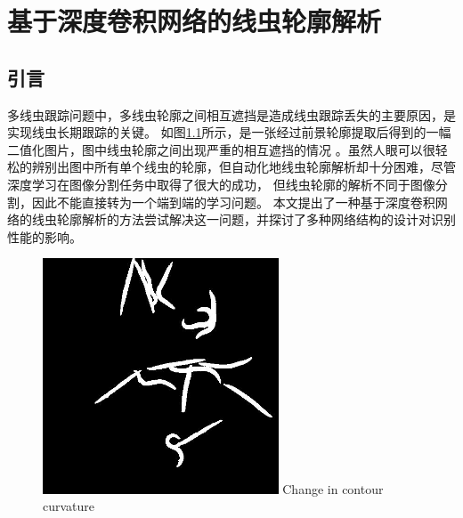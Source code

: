 \chapter{基于深度卷积网络的线虫轮廓解析}
\section{引言}
	多线虫跟踪问题中，多线虫轮廓之间相互遮挡是造成线虫跟踪丢失的主要原因，是实现线虫长期跟踪的关键。
	如图\ref{fig:multiworm}所示，是一张经过前景轮廓提取后得到的一幅二值化图片，图中线虫轮廓之间出现严重的相互遮挡的情况
	。虽然人眼可以很轻松的辨别出图中所有单个线虫的轮廓，但自动化地线虫轮廓解析却十分困难，尽管深度学习在图像分割任务中取得了很大的成功，
	但线虫轮廓的解析不同于图像分割，因此不能直接转为一个端到端的学习问题。
	本文提出了一种基于深度卷积网络的线虫轮廓解析的方法尝试解决这一问题，并探讨了多种网络结构的设计对识别性能的影响。
	\begin{figure}[h]
	  \centering
	  \includegraphics[width=7cm]{figure/chap4/multi-worm.jpg}
		{Change in contour curvature}
	  \label{fig:multiworm}
	\end{figure}

